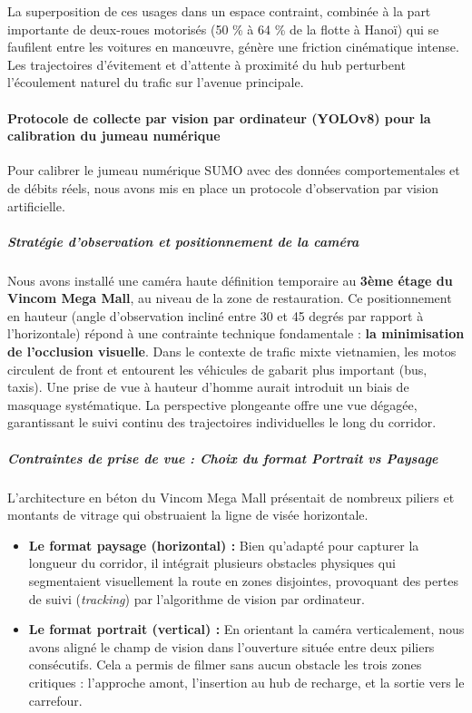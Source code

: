 \documentclass[10pt, a4paper]{article}
\providecommand{\tightlist}{}
\begin{document}
La superposition de ces usages dans un espace contraint, combinée à la
part importante de deux-roues motorisés (50 \% à 64 \% de la flotte à
Hanoï) qui se faufilent entre les voitures en manœuvre, génère une
friction cinématique intense. Les trajectoires d'évitement et d'attente
à proximité du hub perturbent l'écoulement naturel du trafic sur
l'avenue principale.

\paragraph{Protocole de collecte par vision par ordinateur (YOLOv8) pour
la calibration du jumeau
numérique}\label{protocole-de-collecte-par-vision-par-ordinateur-yolov8-pour-la-calibration-du-jumeau-numuxe9rique}

Pour calibrer le jumeau numérique SUMO avec des données comportementales
et de débits réels, nous avons mis en place un protocole d'observation
par vision artificielle.

\subparagraph{Stratégie d'observation et positionnement de la
caméra}\label{stratuxe9gie-dobservation-et-positionnement-de-la-camuxe9ra}

Nous avons installé une caméra haute définition temporaire au
\textbf{3ème étage du Vincom Mega Mall}, au niveau de la zone de
restauration. Ce positionnement en hauteur (angle d'observation incliné
entre 30 et 45 degrés par rapport à l'horizontale) répond à une
contrainte technique fondamentale : \textbf{la minimisation de
l'occlusion visuelle}. Dans le contexte de trafic mixte vietnamien, les
motos circulent de front et entourent les véhicules de gabarit plus
important (bus, taxis). Une prise de vue à hauteur d'homme aurait
introduit un biais de masquage systématique. La perspective plongeante
offre une vue dégagée, garantissant le suivi continu des trajectoires
individuelles le long du corridor.

\subparagraph{Contraintes de prise de vue : Choix du format Portrait vs
Paysage}\label{contraintes-de-prise-de-vue-choix-du-format-portrait-vs-paysage}

L'architecture en béton du Vincom Mega Mall présentait de nombreux
piliers et montants de vitrage qui obstruaient la ligne de visée
horizontale.

\begin{itemize}
\tightlist
\item
  \textbf{Le format paysage (horizontal) :} Bien qu'adapté pour capturer
  la longueur du corridor, il intégrait plusieurs obstacles physiques
  qui segmentaient visuellement la route en zones disjointes, provoquant
  des pertes de suivi (\emph{tracking}) par l'algorithme de vision par
  ordinateur.
\item
  \textbf{Le format portrait (vertical) :} En orientant la caméra
  verticalement, nous avons aligné le champ de vision dans l'ouverture
  située entre deux piliers consécutifs. Cela a permis de filmer sans
  aucun obstacle les trois zones critiques : l'approche amont,
  l'insertion au hub de recharge, et la sortie vers le carrefour.
\end{itemize}
\end{document}
